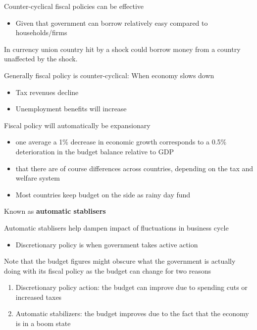 \documentclass{beamer}
\begin{document}
\begin{frame}
  Counter-cyclical fiscal policies can be effective
  \begin{itemize}
    \item Given that government can borrow relatively easy compared to households/firms
  \end{itemize}
  \medskip
  In currency union country hit by a shock could borrow money from a country unaffected by the shock.
\end{frame}

\begin{frame}
  Generally fiscal policy is counter-cyclical: When economy slows down
  \begin{itemize}
    \item Tax revenues decline
    \item Unemployment benefits will increase
  \end{itemize}
  \medskip
  Fiscal policy will automatically be expansionary
  \begin{itemize}
    \item one average a 1\% decrease in economic growth corresponds to a 0.5\% deterioration in the budget balance relative to GDP
    \item that there are of course differences across countries, depending on the tax and welfare system
    \item Most countries keep budget on the side as rainy day fund
  \end{itemize}
 Known as \textbf{automatic stablisers}
\end{frame}

\begin{frame}
 Automatic stablisers help dampen impact of fluctuations in business cycle
  \begin{itemize}
    \item Discretionary policy is when government takes active action
  \end{itemize}
  \medskip
  Note that the budget figures might obscure what the government is actually doing with its fiscal policy as the budget can change for two reasons
\begin{enumerate}
  \item Discretionary policy action: the budget can improve due to spending cuts or increased taxes
  \item Automatic stabilizers: the budget improves due to the fact that the economy is in a boom state
\end{enumerate}
\end{frame}
\end{document}
